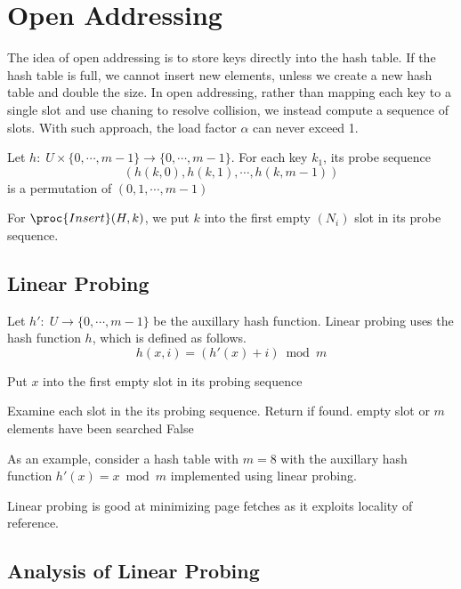 \section{Open Addressing} 

The idea of open addressing is to store keys directly into the hash table. If the hash table is full, we cannot insert new elements, unless we create a new hash table and double the size. In open addressing, rather than mapping each key to a single slot and use chaning to resolve collision, we instead compute a sequence of slots. With such approach, the load factor $\alpha$ can never exceed 1.

Let $h:\; U \times \{0,\cdots,m-1\} \to \{0,\cdots,m-1\}$. For each key $k_1$, its probe sequence 
$$
(h(k,0), h(k,1),\cdots, h(k,m-1))
$$
is a permutation of $(0,1,\cdots,m-1)$ 

For $\proc{Insert}(H,k)$, we put $k$ into the first empty $(N_i)$ slot in its probe sequence.

\subsection{Linear Probing} 

Let $h':\; U \to \{0,\cdots,m-1\}$ be the auxillary hash function. Linear probing uses the hash function $h$, which is defined as follows.
$$
h(x,i) = (h'(x) + i) \bmod m
$$

\begin{codebox}
    \zi Put $x$ into the first empty slot in its probing sequence
\end{codebox}

\begin{codebox}
    \zi Examine each slot in the its probing sequence. Return if found.
    \zi \If empty slot or $m$ elements have been searched \Then
        \zi \Return False
\end{codebox}

As an example, consider a hash table with $m=8$ with the auxillary hash function $h'(x) = x \bmod m$ implemented using linear probing.

Linear probing is good at minimizing page fetches as it exploits locality of reference.

\subsection{Analysis of Linear Probing}

